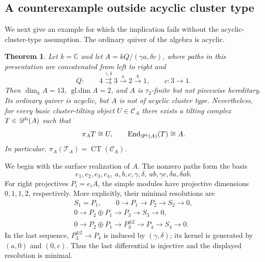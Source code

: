 \documentclass[12pt,a4paper,english,reqno]{amsart}
\theoremstyle{plain}
\newtheorem{thm}{Theorem}[section]
\theoremstyle{definition}
\numberwithin{equation}{section}
\def\ga{\gamma}
\def\de{\delta}
\def\ta{\tau}
\def\End{\operatorname{End}}
\def\Db{{\mathcal D}^{\text{\rm b}}}
\def\calC{{\mathcal C}}
\def\bbC{{\mathbb C}}
\def\iso{\cong}
\def\ds{\oplus}
\def\ya#1{\xrightarrow{#1}}
\newcommand{\CT}{\operatorname{CT}}
\begin{document}
\subsection{A counterexample outside acyclic cluster type}\label{subsec:torus-example}
We next give an example for which the implication fails without the acyclic-cluster-type assumption. The ordinary quiver of the algebra is acyclic.

\begin{thm}\label{thm:torus-counterexample}
Let $k=\bbC$ and let $A=kQ/(\ga a,\de c)$, where paths in this presentation are concatenated from left to right and
\[
 Q:\qquad
 4\overset{\ga,\de}{\rightrightarrows}3
   \ya{a}2\ya{b}1,
 \qquad c:3\longrightarrow1.
\]
Then $\dim_k A=13$, $\operatorname{gl.dim}A=2$, and $A$ is $\ta_2$-finite but not piecewise hereditary. Its ordinary quiver is acyclic, but $A$ is not of acyclic cluster type. Nevertheless, for every basic cluster-tilting object $U\in\calC_A$ there exists a tilting complex $T\in\Db(A)$ such that
\[
 \pi_A T\iso U,\qquad \End_{\Db(A)}(T)\iso A.
\]
In particular, $\pi_A(\mathcal T_A)=\CT(\calC_A)$.
\end{thm}

We begin with the surface realization of $A$.
The nonzero paths form the basis
\[
 e_1,e_2,e_3,e_4,\ a,b,c,\ga,\de,\ ab,\ga c,\de a,\de ab.
\]
For right projectives $P_i=e_iA$, the simple modules have projective dimensions $0,1,1,2$, respectively. More explicitly, their minimal resolutions are
\[
\begin{gathered}
 S_1=P_1,\qquad 0\longrightarrow P_1\longrightarrow P_2\longrightarrow S_2\longrightarrow0,\\
 0\longrightarrow P_2\ds P_1\longrightarrow P_3\longrightarrow S_3\longrightarrow0,\\
 0\longrightarrow P_2\ds P_1\longrightarrow P_3^{\ds2}
   \longrightarrow P_4\longrightarrow S_4\longrightarrow0.
\end{gathered}
\]
In the last sequence, $P_3^{\ds2}\to P_4$ is induced by $(\ga,\de)$; its kernel is generated by $(a,0)$ and $(0,c)$. Thus the last differential is injective and the displayed resolution is minimal.
\end{document}
